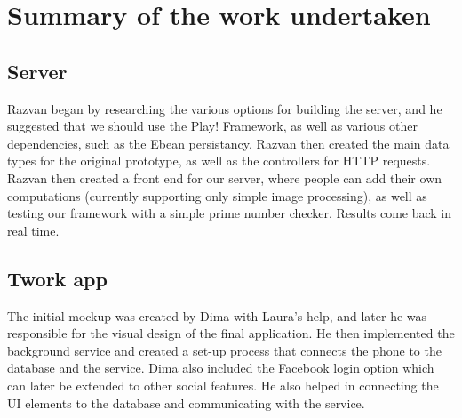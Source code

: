 \documentclass[a4paper,10pt]{article}
\begin{document}

\section{Summary of the work undertaken}

\subsection{Server}


Razvan began by researching the various options for building the server, and he suggested that we should use the Play! Framework, as well as various other dependencies, such as the Ebean persistancy. Razvan then created the main data types for the original prototype, as well as the controllers for HTTP requests. 
Razvan then created a front end for our server, where people can add their own computations (currently supporting only simple image processing), as well as testing our framework with a simple  prime number checker. Results come back in real time.

\subsection{Twork app}
The initial mockup was created by Dima with Laura's help, and later he was responsible for the visual design of the final application. He then implemented the background service and created a set-up process that connects the phone to the database and the service. Dima also included the Facebook login option which can later be extended to other social features. He also helped in connecting the UI elements to the database and communicating with the service.
\end{document}
